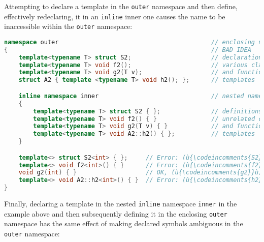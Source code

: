\noindent Attempting to declare a template in the \texttt{outer} namespace and
then define, effectively redeclaring, it in an \texttt{inline} inner one
causes the name to be inaccessible within the \texttt{outer} namespace:

\begin{lstlisting}[language=C++]
namespace outer                                          // enclosing namespace
{                                                        // BAD IDEA
    template<typename T> struct S2;                      // declarations of
    template<typename T> void f2();                      // various class
    template<typename T> void g2(T v);                   // and function
    struct A2 { template <typename T> void h2(); };      // templates

    inline namespace inner                               // nested namespace
    {
        template<typename T> struct S2 { };              // definitions of
        template<typename T> void f2() { }               // unrelated class
        template<typename T> void g2(T v) { }            // and function
        template<typename T> void A2::h2() { };          // templates
    }

    template<> struct S2<int> { };     // Error: (ù{\codeincomments{S2}}ù) is ambiguous in (ù{\codeincomments{outer}}ù).
    template<> void f2<int>() { }      // Error: (ù{\codeincomments{f2}}ù) is ambiguous in (ù{\codeincomments{outer}}ù).
    void g2(int) { }                   // OK, (ù{\codeincomments{g2}}ù) is an overload definition.
    template<> void A2::h2<int>() { }  // Error: (ù{\codeincomments{h2}}ù) is ambiguous in (ù{\codeincomments{outer}}ù).
}
\end{lstlisting}

\noindent Finally, declaring a template in the nested \texttt{inline} namespace
\texttt{inner} in the example above and then subsequently defining it in
the enclosing \texttt{outer} namespace has the same effect of making
declared symbols ambiguous in the \texttt{outer} namespace:

